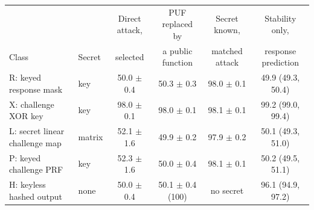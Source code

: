 \begin{tabular}{llcccc}
\toprule
 & & Direct attack, & PUF replaced by & Secret known, & Stability only, \\
Class & Secret & selected & a public function & matched attack & response prediction \\
\midrule
R: keyed response mask & key & 50.0 $\pm$ 0.4 & 50.3 $\pm$ 0.3 & 98.0 $\pm$ 0.1 & 49.9 (49.3, 50.4) \\
X: challenge XOR key & key & 98.0 $\pm$ 0.1 & 98.0 $\pm$ 0.1 & 98.1 $\pm$ 0.1 & 99.2 (99.0, 99.4) \\
L: secret linear challenge map & matrix & 52.1 $\pm$ 1.6 & 49.9 $\pm$ 0.2 & 97.9 $\pm$ 0.2 & 50.1 (49.3, 51.0) \\
P: keyed challenge PRF & key & 52.3 $\pm$ 1.6 & 50.0 $\pm$ 0.4 & 98.1 $\pm$ 0.1 & 50.2 (49.5, 51.1) \\
H: keyless hashed output & none & 50.0 $\pm$ 0.4 & 50.1 $\pm$ 0.4 (100) & no secret & 96.1 (94.9, 97.2) \\
\bottomrule
\end{tabular}
